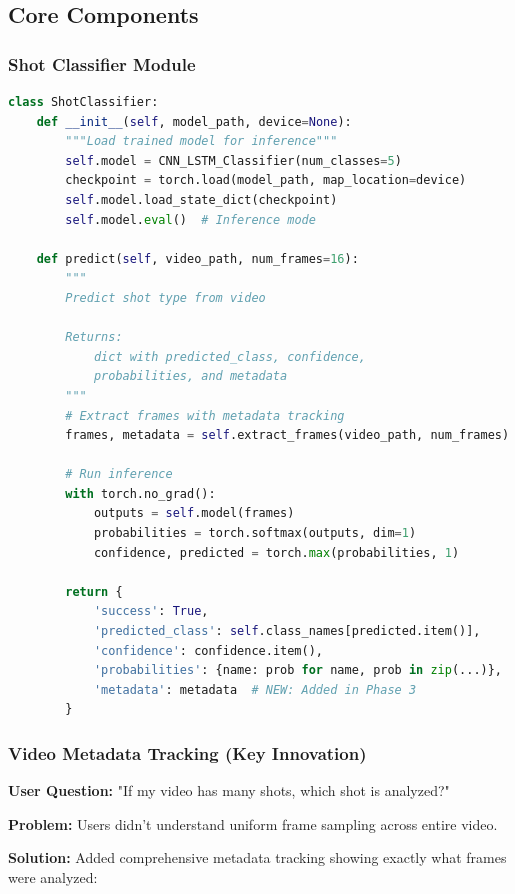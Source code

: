 \documentclass[11pt,a4paper]{article}
\begin{document}
\subsection{Core Components}

\subsubsection{Shot Classifier Module}

\begin{lstlisting}[language=Python, caption=Shot Classifier Interface]
class ShotClassifier:
    def __init__(self, model_path, device=None):
        """Load trained model for inference"""
        self.model = CNN_LSTM_Classifier(num_classes=5)
        checkpoint = torch.load(model_path, map_location=device)
        self.model.load_state_dict(checkpoint)
        self.model.eval()  # Inference mode

    def predict(self, video_path, num_frames=16):
        """
        Predict shot type from video

        Returns:
            dict with predicted_class, confidence,
            probabilities, and metadata
        """
        # Extract frames with metadata tracking
        frames, metadata = self.extract_frames(video_path, num_frames)

        # Run inference
        with torch.no_grad():
            outputs = self.model(frames)
            probabilities = torch.softmax(outputs, dim=1)
            confidence, predicted = torch.max(probabilities, 1)

        return {
            'success': True,
            'predicted_class': self.class_names[predicted.item()],
            'confidence': confidence.item(),
            'probabilities': {name: prob for name, prob in zip(...)},
            'metadata': metadata  # NEW: Added in Phase 3
        }
\end{lstlisting}

\subsubsection{Video Metadata Tracking (Key Innovation)}

\textbf{User Question:} "If my video has many shots, which shot is analyzed?"

\textbf{Problem:} Users didn't understand uniform frame sampling across entire video.

\textbf{Solution:} Added comprehensive metadata tracking showing exactly what frames were analyzed:
\end{document}
